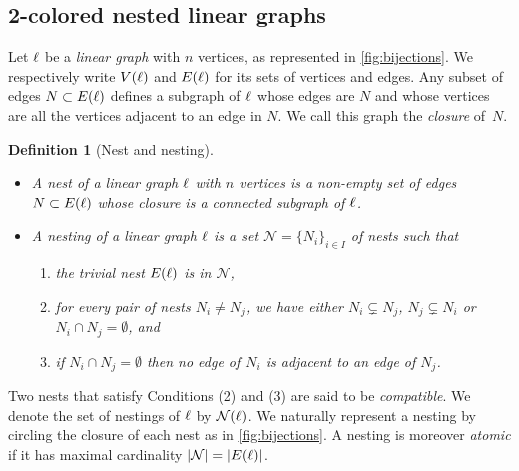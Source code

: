 \documentclass[10pt]{amsart}
\newtheorem{definition}{Definition}[section]
\theoremstyle{remark}
\begin{document}

\subsection{2-colored nested linear graphs} \label{ss:2-col}

Let $\ell$ be a \emph{linear graph} with $n$ vertices, as represented in \cref{fig:bijections}.
We respectively write $V(\ell)$ and $E(\ell)$ for its sets of vertices and edges.
Any subset of edges $N\subset E(\ell)$ defines a subgraph of $\ell$ whose edges are $N$ and whose vertices are all the vertices adjacent to an edge in $N$. 
We call this graph the \emph{closure} of~$N$. 

\begin{definition}[Nest and nesting]
\leavevmode
\begin{itemize}[leftmargin=*]
\item A \emph{nest} of a linear graph $\ell$ with $n$ vertices is a non-empty set of edges $N \subset E(\ell)$ whose closure is a connected subgraph of $\ell$.  
\item A \emph{nesting} of a linear graph $\ell$ is a set $\mathcal{N}=\{N_i\}_{i\in I}$ of nests such that 
\begin{enumerate}[leftmargin=*]
    \item the \emph{trivial nest} $E(\ell)$ is in $\mathcal{N}$,
    \item for every pair of nests $N_i\neq N_j$, we have either $N_i \subsetneq N_j$, $N_j \subsetneq N_i$ or $N_i \cap N_j = \emptyset$, and
    \item if $N_i \cap N_j = \emptyset$ then no edge of $N_i$ is adjacent to an edge of $N_j$.
\end{enumerate}
\end{itemize}
\end{definition}

Two nests that satisfy Conditions (2) and (3) are said to be \textit{compatible}. 
We denote the set of nestings of $\ell$ by $\mathcal{N}(\ell)$. 
We naturally represent a nesting by circling the closure of each nest as in \cref{fig:bijections}. 
A nesting is moreover \emph{atomic} if it has maximal cardinality $|\mathcal{N}|=|E(\ell)|$.
\end{document}
